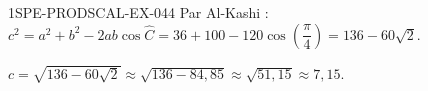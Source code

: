 \begin{corrige}{1SPE-PRODSCAL-EX-044}
Par Al-Kashi : $c^2 = a^2 + b^2 - 2ab\cos\widehat{C} = 36 + 100 - 120\cos\!\left(\dfrac{\pi}{4}\right) = 136 - 60\sqrt{2}$.

$c = \sqrt{136 - 60\sqrt{2}} \approx \sqrt{136 - 84{,}85} \approx \sqrt{51{,}15} \approx 7{,}15$.
\end{corrige}

